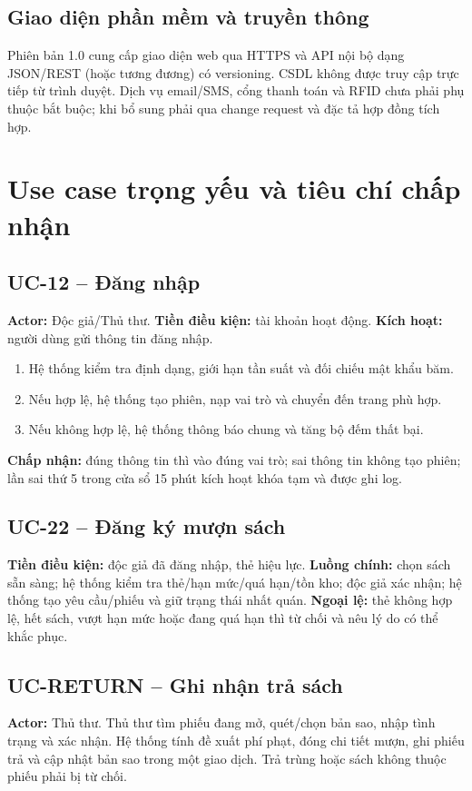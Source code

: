 \documentclass[12pt,a4paper,oneside]{report}
\begin{document}
\section{Giao diện phần mềm và truyền thông}
Phiên bản 1.0 cung cấp giao diện web qua HTTPS và API nội bộ dạng JSON/REST (hoặc tương đương) có versioning. CSDL không được truy cập trực tiếp từ trình duyệt. Dịch vụ email/SMS, cổng thanh toán và RFID chưa phải phụ thuộc bắt buộc; khi bổ sung phải qua change request và đặc tả hợp đồng tích hợp.

\chapter{Use case trọng yếu và tiêu chí chấp nhận}
\section{UC-12 -- Đăng nhập}
\textbf{Actor:} Độc giả/Thủ thư. \textbf{Tiền điều kiện:} tài khoản hoạt động. \textbf{Kích hoạt:} người dùng gửi thông tin đăng nhập.
\begin{enumerate}
\item Hệ thống kiểm tra định dạng, giới hạn tần suất và đối chiếu mật khẩu băm.
\item Nếu hợp lệ, hệ thống tạo phiên, nạp vai trò và chuyển đến trang phù hợp.
\item Nếu không hợp lệ, hệ thống thông báo chung và tăng bộ đếm thất bại.
\end{enumerate}
\textbf{Chấp nhận:} đúng thông tin thì vào đúng vai trò; sai thông tin không tạo phiên; lần sai thứ 5 trong cửa sổ 15 phút kích hoạt khóa tạm và được ghi log.

\section{UC-22 -- Đăng ký mượn sách}
\textbf{Tiền điều kiện:} độc giả đã đăng nhập, thẻ hiệu lực. \textbf{Luồng chính:} chọn sách sẵn sàng; hệ thống kiểm tra thẻ/hạn mức/quá hạn/tồn kho; độc giả xác nhận; hệ thống tạo yêu cầu/phiếu và giữ trạng thái nhất quán. \textbf{Ngoại lệ:} thẻ không hợp lệ, hết sách, vượt hạn mức hoặc đang quá hạn thì từ chối và nêu lý do có thể khắc phục.

\section{UC-RETURN -- Ghi nhận trả sách}
\textbf{Actor:} Thủ thư. Thủ thư tìm phiếu đang mở, quét/chọn bản sao, nhập tình trạng và xác nhận. Hệ thống tính đề xuất phí phạt, đóng chi tiết mượn, ghi phiếu trả và cập nhật bản sao trong một giao dịch. Trả trùng hoặc sách không thuộc phiếu phải bị từ chối.
\end{document}
